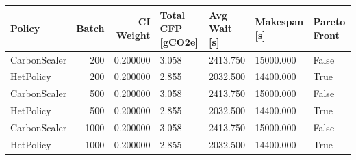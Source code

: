 \begin{tabular}{lrrllll}
\toprule
Policy & Batch & CI Weight & Total CFP [gCO2e] & Avg Wait [s] & Makespan [s] & Pareto Front \\
\midrule
CarbonScaler & 200 & 0.200000 & 3.058 & 2413.750 & 15000.000 & False \\
HetPolicy & 200 & 0.200000 & 2.855 & 2032.500 & 14400.000 & True \\
CarbonScaler & 500 & 0.200000 & 3.058 & 2413.750 & 15000.000 & False \\
HetPolicy & 500 & 0.200000 & 2.855 & 2032.500 & 14400.000 & True \\
CarbonScaler & 1000 & 0.200000 & 3.058 & 2413.750 & 15000.000 & False \\
HetPolicy & 1000 & 0.200000 & 2.855 & 2032.500 & 14400.000 & True \\
\bottomrule
\end{tabular}
